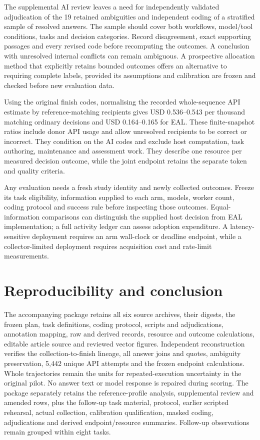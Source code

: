 \documentclass[
  11pt,
]{article}
\begin{document}
The supplemental AI review leaves a need for independently validated
adjudication of the 19 retained ambiguities and independent coding of a
stratified sample of resolved answers. The sample should cover both
workflows, model/tool conditions, tasks and decision categories. Record
disagreement, exact supporting passages and every revised code before
recomputing the outcomes. A conclusion with unresolved internal
conflicts can remain ambiguous. A prospective allocation method that
explicitly retains bounded outcomes offers an alternative to requiring
complete labels, provided its assumptions and calibration are frozen and
checked before new evaluation data.

Using the original finish codes, normalising the recorded whole-sequence
API estimate by reference-matching recipients gives USD 0.536--0.543 per
thousand matching ordinary decisions and USD 0.164--0.165 for EAL. These
finite-snapshot ratios include donor API usage and allow unresolved
recipients to be correct or incorrect. They condition on the AI codes
and exclude host computation, task authoring, maintenance and assessment
work. They describe one resource per measured decision outcome, while
the joint endpoint retains the separate token and quality criteria.

Any evaluation needs a fresh study identity and newly collected
outcomes. Freeze its task eligibility, information supplied to each arm,
models, worker count, coding protocol and success rule before inspecting
those outcomes. Equal-information comparisons can distinguish the
supplied host decision from EAL implementation; a full activity ledger
can assess adoption expenditure. A latency-sensitive deployment requires
an arm wall-clock or deadline endpoint, while a collector-limited
deployment requires acquisition cost and rate-limit measurements.

\FloatBarrier

\hypertarget{reproducibility-and-conclusion}{%
\section{Reproducibility and
conclusion}\label{reproducibility-and-conclusion}}

The accompanying package retains all six source archives, their digests,
the frozen plan, task definitions, coding protocol, scripts and
adjudications, annotation mapping, raw and derived records, resource and
outcome calculations, editable article source and reviewed vector
figures. Independent reconstruction verifies the collection-to-finish
lineage, all answer joins and quotes, ambiguity preservation, 5,442
unique API attempts and the frozen endpoint calculations. Whole
trajectories remain the units for repeated-execution uncertainty in the
original pilot. No answer text or model response is repaired during
scoring. The package separately retains the reference-profile analysis,
supplemental review and amended rows, plus the follow-up task material,
protocol, earlier scripted rehearsal, actual collection, calibration
qualification, masked coding, adjudications and derived
endpoint/resource summaries. Follow-up observations remain grouped
within eight tasks.
\end{document}
